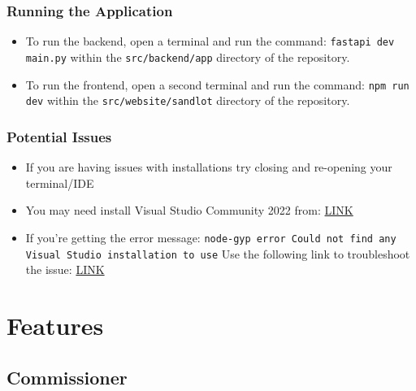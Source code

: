\documentclass{article}
\begin{document}
        \subsubsection{Running the Application}
            \begin{itemize}
                \item To run the backend, open a terminal and run the command:
                \newline \texttt{fastapi dev main.py}
                \newline within the \texttt{src/backend/app} directory of the 
                repository.
                \item To run the frontend, open a second terminal and run the command:
                \newline \texttt{npm run dev}
                \newline within the \texttt{src/website/sandlot} directory of the 
                repository.
            \end{itemize}
        \subsubsection{Potential Issues}
            \begin{itemize}
                \item If you are having issues with installations try closing and re-opening
                your terminal/IDE
                \item You may need install Visual Studio Community 2022 from: 
                \href{https://visualstudio.microsoft.com/vs/community/}{LINK}
                \item If you're getting the error message:
                \newline \texttt{node-gyp error Could not find any Visual Studio installation to use}
                \newline Use the following link to troubleshoot the issue:
                \href{https://stackoverflow.com/questions/70315519/node-gyp-error-could-not-find-any-visual-studio-installation-to-use}{LINK}
            \end{itemize}

\section{Features}
    \subsection{Commissioner}
\end{document}
